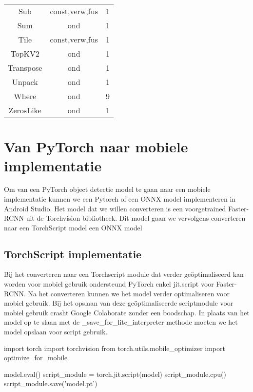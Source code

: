 \begin{table}[!ht]
\begin{tabular}{ccc}
    Sub & const,verw,fus & 1 \\
    Sum & ond & 1 \\
    Tile & const,verw,fus & 1 \\
    TopKV2 & ond & 1 \\
    Transpose & ond & 1 \\
    Unpack & ond & 1 \\
    Where & ond & 9 \\
    ZerosLike & ond & 1 \\
    \hline
\end{tabular}
\label{tab:TFop}
\end{table}

\section{Van PyTorch naar mobiele implementatie}
Om van een PyTorch object detectie model te gaan naar een mobiele implementatie kunnen we een Pytorch of een ONNX model implementeren in Android Studio.
Het model dat we willen converteren is een voorgetrained Faster-RCNN uit de Torchvision bibliotheek.
Dit model gaan we vervolgens converteren naar een TorchScript model een ONNX model

\subsection{TorchScript implementatie}

Bij het converteren naar een Torchscript module dat verder ge\"optimaliseerd kan worden voor mobiel gebruik ondersteund PyTorch enkel jit.script voor Faster-RCNN.
Na het converteren kunnen we het model verder optimaliseren voor mobiel gebruik.
Bij het opslaan van deze ge\"optimaliseerde scriptmodule voor mobiel gebruik crasht Google Colaborate zonder een boodschap.
In plaats van het model op te slaan met de \_save\_for\_lite\_interpreter methode moeten we het model opslaan voor script gebruik.

\begin{python}
import torch
import torchvision
from torch.utils.mobile_optimizer import optimize_for_mobile
        
model.eval()
script_module = torch.jit.script(model)
script_module.cpu()
script_module.save('model.pt')
\end{python}

